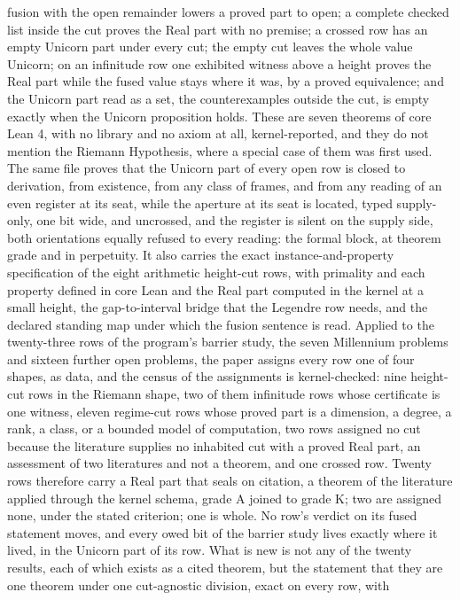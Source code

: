 \documentclass[10pt]{article}
\begin{document}
{\begin{minipage}{\textwidth}
{fusion with the open remainder lowers a proved part to open; a complete
checked list inside the cut proves the Real part with no premise; a
crossed row has an empty Unicorn part under every cut; the empty cut
leaves the whole value Unicorn; on an infinitude row one exhibited
witness above a height proves the Real part while the fused value stays
where it was, by a proved equivalence; and the Unicorn part read as a
set, the counterexamples outside the cut, is empty exactly when the
Unicorn proposition holds. These are seven theorems of core Lean 4, with
no library and no axiom at all, kernel-reported, and they do not mention
the Riemann Hypothesis, where a special case of them was first used. The
same file proves that the Unicorn part of every open row is closed to
derivation, from existence, from any class of frames, and from any
reading of an even register at its seat, while the aperture at its seat
is located, typed supply-only, one bit wide, and uncrossed, and the
register is silent on the supply side, both orientations equally refused
to every reading: the formal block, at theorem grade and in perpetuity.
It also carries the exact instance-and-property specification of the
eight arithmetic height-cut rows, with primality and each property
defined in core Lean and the Real part computed in the kernel at a small
height, the gap-to-interval bridge that the Legendre row needs, and the
declared standing map under which the fusion sentence is read. Applied
to the twenty-three rows of the program's barrier study, the seven
Millennium problems and sixteen further open problems, the paper assigns
every row one of four shapes, as data, and the census of the assignments
is kernel-checked: nine height-cut rows in the Riemann shape, two of
them infinitude rows whose certificate is one witness, eleven regime-cut
rows whose proved part is a dimension, a degree, a rank, a class, or a
bounded model of computation, two rows assigned no cut because the
literature supplies no inhabited cut with a proved Real part, an
assessment of two literatures and not a theorem, and one crossed row.
Twenty rows therefore carry a Real part that seals on citation, a
theorem of the literature applied through the kernel schema, grade A
joined to grade K; two are assigned none, under the stated criterion;
one is whole. No row's verdict on its fused statement moves, and every
owed bit of the barrier study lives exactly where it lived, in the
Unicorn part of its row. What is new is not any of the twenty results,
each of which exists as a cited theorem, but the statement that they are
one theorem under one cut-agnostic division, exact on every row, with
}
\end{minipage}}
\end{document}
